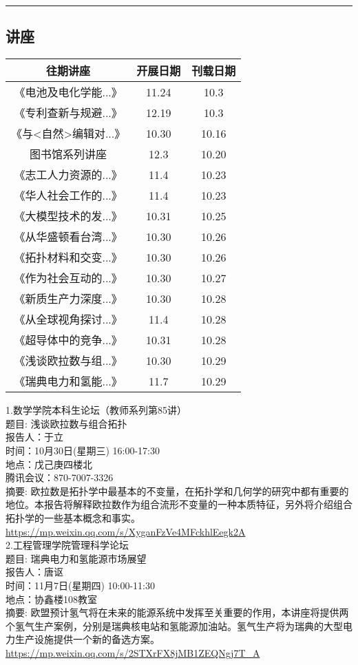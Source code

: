 \documentclass[letterpaper, 12pt]{article}
\begin{document}
\hrule
\pagebreak
\begin{multicols}{2}

\section{讲座}
\begin{tabular}{|c|c|c|}
    \hline
    往期讲座 & 开展日期 & 刊载日期\\
    \hline\hline
    《电池及电化学能...》 & 11.24 & 10.3\\
    《专利查新与规避...》 & 12.19 & 10.3\\
    《与<自然>编辑对...》 & 10.30 & 10.16\\
    图书馆系列讲座 & 12.3 & 10.20\\
    《志工人力资源的...》 & 11.4 & 10.23\\
    《华人社会工作的...》 & 11.4 & 10.23\\
    《大模型技术的发...》 & 10.31 & 10.25\\
    《从华盛顿看台湾...》 & 10.30 & 10.26\\
    《拓扑材料和交变...》 & 10.30 & 10.26\\
    《作为社会互动的...》 & 10.30 & 10.27\\
    《新质生产力深度...》 & 10.30 & 10.28\\
    《从全球视角探讨...》 & 11.4 & 10.28\\
    《超导体中的竞争...》 & 10.31 & 10.28\\
    《浅谈欧拉数与组...》 & 10.30 & 10.29\\
    《瑞典电力和氢能...》 & 11.7 & 10.29\\
    \hline
\end{tabular}

1.数学学院本科生论坛（教师系列第85讲）\\
题目: 浅谈欧拉数与组合拓扑\\
报告人：于立\\
时间：10月30日(星期三) 16:00-17:30\\
地点：戊己庚四楼北\\
腾讯会议：870-7007-3326\\
摘要: 欧拉数是拓扑学中最基本的不变量，在拓扑学和几何学的研究中都有重要的地位。本报告将解释欧拉数作为组合流形不变量的一种本质特征，另外将介绍组合拓扑学的一些基本概念和事实。\\
\url{https://mp.weixin.qq.com/s/XyganFzVe4MFckhlEegk2A}\\
2.工程管理学院管理科学论坛\\
题目: 瑞典电力和氢能源市场展望\\
报告人：唐讴\\
时间：11月7日(星期四) 10:00-11:30\\
地点：协鑫楼108教室\\
摘要: 欧盟预计氢气将在未来的能源系统中发挥至关重要的作用，本讲座将提供两个氢气生产案例，分别是瑞典核电站和氢能源加油站。氢气生产将为瑞典的大型电力生产设施提供一个新的备选方案。\\
\url{https://mp.weixin.qq.com/s/2STXrFX8jMB1ZEQNgj7T_A}\\




\end{multicols}
\end{document}
